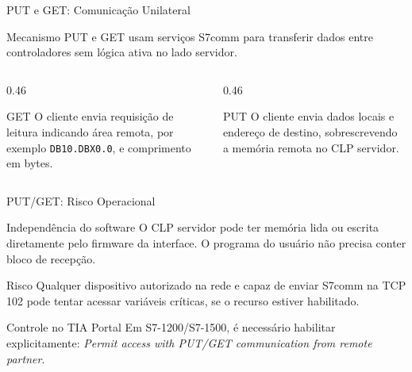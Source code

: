\documentclass[10pt, aspectratio=169]{beamer}
\begin{document}
\begin{frame}{PUT e GET: Comunica\c{c}\~ao Unilateral}
    \small
    \begin{block}{Mecanismo}
        PUT e GET usam servi\c{c}os S7comm para transferir dados entre controladores sem l\'ogica ativa no lado servidor.
    \end{block}

    \begin{columns}[T,totalwidth=\textwidth]
        \begin{column}{0.46\textwidth}
            \begin{block}{GET}
                O cliente envia requisi\c{c}\~ao de leitura indicando \'area remota, por exemplo \texttt{DB10.DBX0.0}, e comprimento em bytes.
            \end{block}
        \end{column}
        \begin{column}{0.46\textwidth}
            \begin{block}{PUT}
                O cliente envia dados locais e endere\c{c}o de destino, sobrescrevendo a mem\'oria remota no CLP servidor.
            \end{block}
        \end{column}
    \end{columns}
\end{frame}

\begin{frame}{PUT/GET: Risco Operacional}
    \small
    \begin{block}{Independ\^encia do software}
        O CLP servidor pode ter mem\'oria lida ou escrita diretamente pelo firmware da interface. O programa do usu\'ario n\~ao precisa conter bloco de recep\c{c}\~ao.
    \end{block}

    \begin{block}{Risco}
        Qualquer dispositivo autorizado na rede e capaz de enviar S7comm na TCP 102 pode tentar acessar vari\'aveis cr\'iticas, se o recurso estiver habilitado.
    \end{block}

    \begin{block}{Controle no TIA Portal}
        Em S7-1200/S7-1500, \'e necess\'ario habilitar explicitamente: \textit{Permit access with PUT/GET communication from remote partner}.
    \end{block}
\end{frame}
\end{document}
